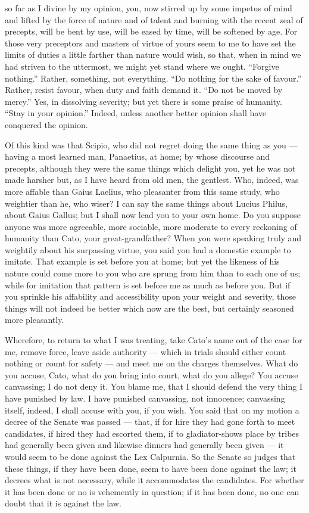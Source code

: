  so far as I divine by my opinion, you, now stirred up by some impetus of mind and lifted by the force of nature and of talent and burning with the recent zeal of precepts, will be bent by use, will be eased by time, will be softened by age. For those very preceptors and masters of virtue of yours seem to me to have set the limits of duties a little farther than nature would wish, so that, when in mind we had striven to the uttermost, we might yet stand where we ought. ``Forgive nothing.'' Rather, something, not everything. ``Do nothing for the sake of favour.'' Rather, resist favour, when duty and faith demand it. ``Do not be moved by mercy.'' Yes, in dissolving severity; but yet there is some praise of humanity. ``Stay in your opinion.'' Indeed, unless another better opinion shall have conquered the opinion.

 Of this kind was that Scipio, who did not regret doing the same thing as you --- having a most learned man, Panaetius, at home; by whose discourse and precepts, although they were the same things which delight you, yet he was not made harsher but, as I have heard from old men, the gentlest. Who, indeed, was more affable than Gaius Laelius, who pleasanter from this same study, who weightier than he, who wiser? I can say the same things about Lucius Philus, about Gaius Gallus; but I shall now lead you to your own home. Do you suppose anyone was more agreeable, more sociable, more moderate to every reckoning of humanity than Cato, your great-grandfather? When you were speaking truly and weightily about his surpassing virtue, you said you had a domestic example to imitate. That example is set before you at home; but yet the likeness of his nature could come more to you who are sprung from him than to each one of us; while for imitation that pattern is set before me as much as before you. But if you sprinkle his affability and accessibility upon your weight and severity, those things will not indeed be better which now are the best, but certainly seasoned more pleasantly.

 Wherefore, to return to what I was treating, take Cato's name out of the case for me, remove force, leave aside authority --- which in trials should either count nothing or count for safety --- and meet me on the charges themselves. What do you accuse, Cato, what do you bring into court, what do you allege? You accuse canvassing; I do not deny it. You blame me, that I should defend the very thing I have punished by law. I have punished canvassing, not innocence; canvassing itself, indeed, I shall accuse with you, if you wish. You said that on my motion a decree of the Senate was passed --- that, if for hire they had gone forth to meet candidates, if hired they had escorted them, if to gladiator-shows place by tribes had generally been given and likewise dinners had generally been given --- it would seem to be done against the Lex Calpurnia. So the Senate so judges that these things, if they have been done, seem to have been done against the law; it decrees what is not necessary, while it accommodates the candidates. For whether it has been done or no is vehemently in question; if it has been done, no one can doubt that it is against the law.


